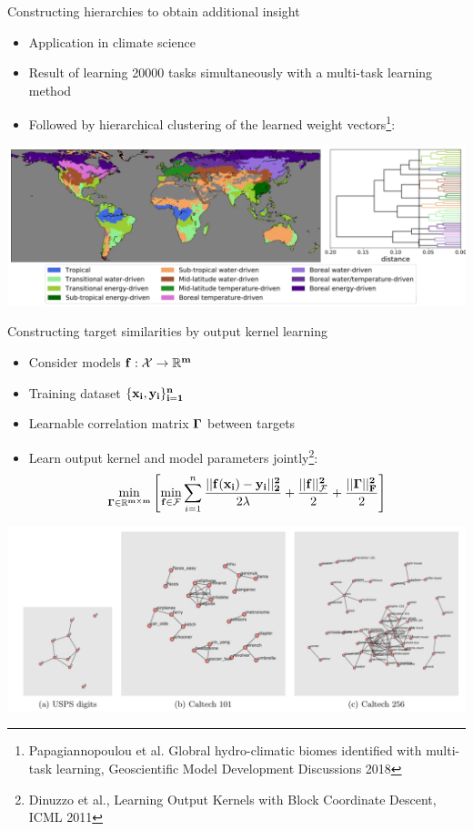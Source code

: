 \documentclass[]{beamer}
\begin{document}
\begin{frame}{Constructing hierarchies to obtain additional insight}

\begin{itemize}
\item Application in climate science
\item Result of learning 20000 tasks simultaneously with a multi-task learning method
\item Followed by hierarchical clustering of the learned weight vectors\footnote{Papagiannopoulou et al. Globral hydro-climatic biomes identified with multi-task learning, Geoscientific Model Development Discussions 2018}:
\end{itemize}
\begin{center}
\includegraphics[scale=0.2]{Figures/biomes} 
\end{center}

\end{frame}

\begin{frame}{Constructing target similarities by output kernel learning}

\begin{itemize}
\item Consider models $\bf{f}: \mathcal{X} \rightarrow \mathbb{R}^m$
\item Training dataset $\{\bf{x}_i,\bf{y}_i\}_{i=1}^n$
\item Learnable correlation matrix $\bf{\Gamma}$ between targets
\item Learn output kernel and model parameters jointly\footnote{Dinuzzo et al., Learning Output Kernels with Block Coordinate Descent, ICML 2011}:
$$\min_{\bf{\Gamma} \in \mathbb{R}^{m \times m}} \left[ \min_{\bf{f} \in \mathcal{F}} \sum_{i=1}^n \frac{||\bf{f}(\bf{x}_i) - \bf{y}_i||_2^2}{2\lambda} + \frac{||\bf{f}||^2_\mathcal{F}}{2} + \frac{
||\bf{\Gamma}||^2_F}{2} \right]$$
\end{itemize}
\begin{center}
\includegraphics[scale=0.2]{Figures/okl}
\end{center}

\end{frame}
\end{document}
